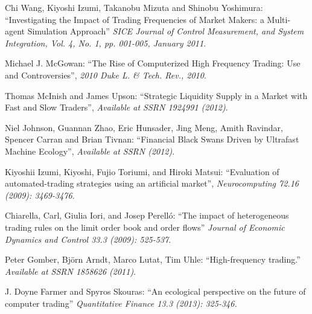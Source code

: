 \documentclass[11pt, a4paper, oneside]{Thesis} %
\begin{document}



\begin{thebibliography}{99}



 Chi Wang, Kiyoshi Izumi, Takanobu Mizuta and Shinobu Yoshimura:
``Investigating the Impact of Trading Frequencies of Market Makers: a Multi-agent Simulation Approach''
 \textit{SICE Journal of Control Measurement, and System Integration, Vol. 4, No. 1, pp. 001-005, January 2011}.

 Michael J. McGowan:
``The Rise of Computerized High Frequency Trading: Use and Controversies'',
\textit{2010 Duke L. \& Tech. Rev., 2010}.

 Thomas McInish and James Upson:
``Strategic Liquidity Supply in a Market with Fast and Slow Traders'',
\textit{Available at SSRN 1924991 (2012)}.

 Niel Johnson, Guannan Zhao, Eric Hunsader, Jing Meng, Amith Ravindar, Spencer Carran and Brian Tivnan: 
``Financial Black Swans Driven by Ultrafast Machine Ecology'', \textit{Available at SSRN (2012)}.

Kiyoshii Izumi, Kiyoshi, Fujio Toriumi, and Hiroki Matsui: ``Evaluation of automated-trading strategies using an artificial market'', \textit{Neurocomputing 72.16 (2009): 3469-3476}.

Chiarella, Carl, Giulia Iori, and Josep Perelló:
``The impact of heterogeneous trading rules on the limit order book and order flows''
\textit{Journal of Economic Dynamics and Control 33.3 (2009): 525-537}.

Peter Gomber, Björn Arndt, Marco Lutat, Tim Uhle:
``High-frequency trading.'' 
\textit{Available at SSRN 1858626 (2011)}.

J. Doyne Farmer and Spyros Skouras:
``An ecological perspective on the future of computer trading''
\textit{Quantitative Finance 13.3 (2013): 325-346.}

\end{thebibliography}
\end{document}
